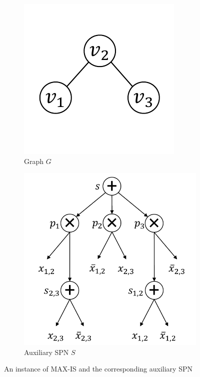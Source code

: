 \documentclass{article}
\theoremstyle{remark}
\theoremstyle{definition}
\begin{document}
\begin{figure}[ht]

\begin{subfigure}{0.33\textwidth}
\includegraphics[width=0.9\linewidth]{is} 
\caption{Graph $G$}
\label{fig:is}
\end{subfigure}
\begin{subfigure}{0.66\textwidth}
\includegraphics[width=0.9\linewidth]{auxspn}
\caption{Auxiliary SPN $S$}
\label{fig:auxspn}
\end{subfigure}

\caption{An instance of MAX-IS and the corresponding auxiliary SPN}
\label{fig:isauxspn}
\end{figure}
\end{document}

